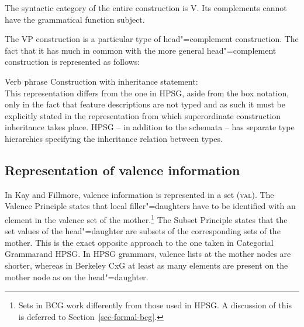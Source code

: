 \noindent
The syntactic category of the entire construction is V.
Its complements cannot have the grammatical function subject.

\largerpage%
The VP construction is a particular type of head"=complement construction. The fact that it has much in common with the more general
head"=complement construction is represented as follows:

\ea
Verb phrase Construction with inheritance statement:\\
\setlength{\fboxsep}{2mm}
\z
This representation differs from the one in HPSG, aside from the box notation, only in the fact that feature descriptions are not typed and as such
it must be explicitly stated in the representation from which superordinate construction inheritance takes place.
HPSG -- in addition to the schemata -- has separate type hierarchies specifying the inheritance relation between types.

\subsection{Representation of valence information}

In Kay and Fillmore, valence information is represented in a set (\textsc{val}). The Valence Principle states that local filler"=daughters have to
be identified with an element in the valence set of the mother.\footnote{%
  Sets in BCG work differently from those used in HPSG. A discussion of this is deferred to Section~\ref{sec-formal-bcg}.%
} The Subset Principle states that the set values of the head"=daughter are subsets of the
corresponding sets of the mother. This is the exact opposite approach to the one taken in Categorial Grammar\indexcg and HPSG\indexhpsg. In HPSG
grammars, valence lists at the mother nodes are shorter, whereas in Berkeley CxG at least as many elements are present on the mother
node as on the head"=daughter.

